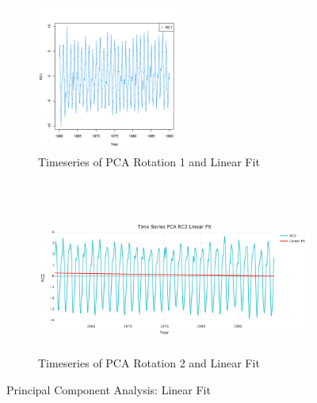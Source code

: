 \documentclass[12pt,a4paper]{article}
\begin{document}
\begin{figure}[!h]
    \centering
    \begin{subfigure}[t]{0.5\textwidth}
        \centering
        \includegraphics[height=1.9in]{./gaphics/q002_e.png}
        \caption{Timeseries of PCA Rotation 1 and Linear Fit} 
    \end{subfigure}%
    ~ 
    \begin{subfigure}[t]{0.5\textwidth}
        \centering
        \includegraphics[height=1.9in]{./gaphics/q002_f.png}
        \caption{Timeseries of PCA Rotation 2 and Linear Fit} 
    \end{subfigure}
    \caption{Principal Component Analysis: Linear Fit}
\end{figure}
\end{document}
